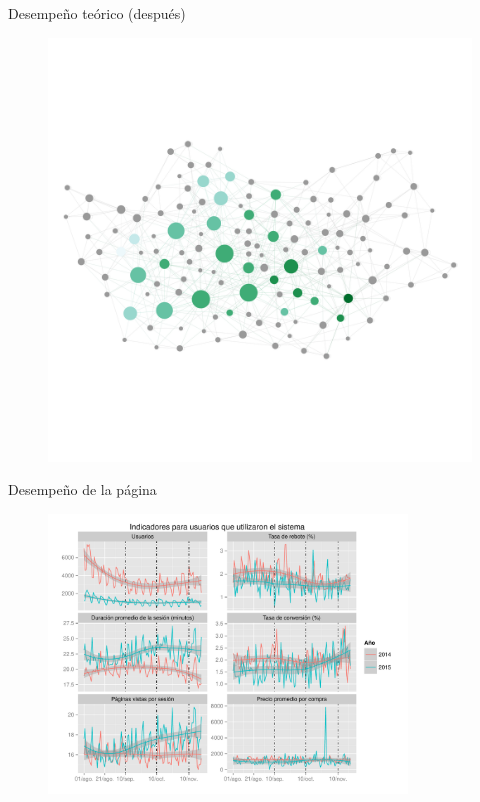 \documentclass{beamer}
\begin{document}
\begin{frame}{Desempeño teórico (después)}
	\begin{figure}
		\centering
		\includegraphics[width=\textwidth, clip = true, trim = 0 0 0 500]{imagenes/cancun_laquinta2.png}
	\end{figure}
\end{frame}

\begin{frame}{Desempeño de la página}
	\begin{figure}
		\centering
		\includegraphics[width=0.85\textwidth]{imagenes/analytics_2015nov23.pdf}
	\end{figure}
\end{frame}
\end{document}
